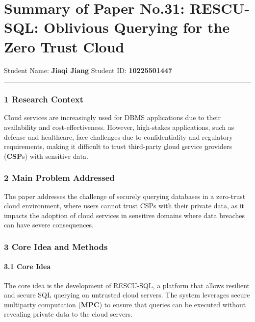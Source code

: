 \documentclass[
]{article}
\author{}
\date{}
\begin{document}
\section{Summary of Paper No.31: RESCU-SQL: Oblivious Querying for the
Zero Trust
Cloud}\label{summary-of-paper-no31-rescu-sql-oblivious-querying-for-the-zero-trust-cloud}

Student Name: \textbf{Jiaqi Jiang} Student ID: \textbf{10225501447}

\begin{center}\rule{0.5\linewidth}{0.5pt}\end{center}

\subsubsection{\texorpdfstring{\textbf{1 Research
Context}}{1 Research Context}}\label{1--research-context}

Cloud services are increasingly used for DBMS applications due to their
availability and cost-effectiveness. However, high-stakes applications,
such as defense and healthcare, face challenges due to confidentiality
and regulatory requirements, making it difficult to trust third-party
\ul{c}loud \ul{s}ervice \ul{p}roviders (\textbf{CSP}s) with sensitive
data.

\subsubsection{\texorpdfstring{\textbf{2 Main Problem
Addressed}}{2 Main Problem Addressed}}\label{2--main-problem-addressed}

The paper addresses the challenge of securely querying databases in a
zero-trust cloud environment, where users cannot trust CSPs with their
private data, as it impacts the adoption of cloud services in sensitive
domains where data breaches can have severe consequences.

\subsubsection{\texorpdfstring{\textbf{3 Core Idea and
Methods}}{3 Core Idea and Methods}}\label{3--core-idea-and-methods}

\paragraph{3.1 Core Idea}\label{31--core-idea}

The core idea is the development of RESCU-SQL, a platform that allows
resilient and secure SQL querying on untrusted cloud servers. The system
leverages secure \ul{m}ulti\ul{p}arty \ul{c}omputation (\textbf{MPC}) to
ensure that queries can be executed without revealing private data to
the cloud servers.
\end{document}

